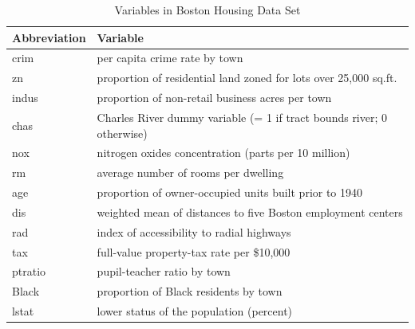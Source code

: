 \documentclass[ejs,authoryear,linksfromyear]{imsart}
\numberwithin{equation}{section}
\theoremstyle{plain}
\begin{document}
\begin{table}[h!] 
	\caption{Variables in Boston Housing Data Set} \label{tabl:housing_variable}
	\centering
	\begin{tabular}{l|l}
		\hline
		Abbreviation & Variable \\
		\hline
		crim & per capita crime rate by town \\
		zn & proportion of residential land zoned for lots over 25,000 sq.ft. \\
		indus & proportion of non-retail business acres per town \\
		chas & Charles River dummy variable (= 1 if tract bounds river; 0 otherwise) \\
		nox & nitrogen oxides concentration (parts per 10 million) \\
		rm & average number of rooms per dwelling \\
		age & proportion of owner-occupied units built prior to 1940 \\
		dis & weighted mean of distances to five Boston employment centers \\
		rad & index of accessibility to radial highways \\
		tax & full-value property-tax rate per \$10,000 \\
		ptratio & pupil-teacher ratio by town \\
		Black & proportion of Black residents by town \\
		lstat & lower status of the population (percent) \\
		\hline
\end{tabular}
\end{table}
\end{document}
